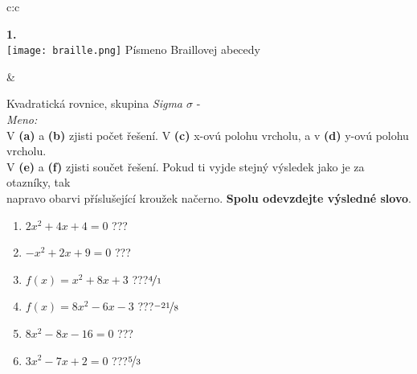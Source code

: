 \documentclass[10pt]{report}
\begin{document}
\begin{tabular}{c:c}
\begin{minipage}[c][99mm][t]{0.49\linewidth}
\begin{center}
\begin{minipage}{0.20\linewidth}
\begin{center}
{\Huge\bfseries 1.} \\[2mm]
\texttt{[image: braille.png]}
{\small Písmeno Braillovej abecedy}
\end{center}
\end{minipage}
\end{center}
\end{minipage}
&
\begin{minipage}[c][99mm][t]{0.49\linewidth}
\begin{center}
\vspace{7mm}
{\huge Kvadratická rovnice, skupina \textit{Sigma $\sigma$} -}\\[4.5mm]
\textit{Meno:}\phantom{xxxxxxxxxxxxxxxxxxxxxxxxxxxxxxxxxxxxxxxxxxxxxxxxxxxxxxxxxxxxxxxxx}\\[3.5mm]
V \textbf{(a)} a \textbf{(b)} zjisti počet řešení. V \textbf{(c)} x-ovú polohu vrcholu, a v \textbf{(d)} y-ovú polohu vrcholu.\\V \textbf{(e)} a \textbf{(f)} zjisti součet řešení. Pokud ti vyjde stejný výsledek jako je za otazníky, tak\\napravo obarvi příslušející kroužek načerno. \textbf{Spolu odevzdejte výsledné slovo}.\\[3mm]
\begin{minipage}{0.77\linewidth}
\begin{center}
\begin{varwidth}{\textwidth}
\begin{enumerate}
\large
\item $2x^2+4x+4=0$\quad \dotfill\; ???\;\dotfill {}
\item $-x^2+2x+9=0$\quad \dotfill\; ???\;\dotfill {}
\item $f(x)=x^2+8x+3$\quad \dotfill\; ???\;\dotfill \quad $\nicefrac{4}{1}$
\item $f(x)=8x^2-6x-3$\quad \dotfill\; ???\;\dotfill \quad $\nicefrac{-21}{8}$
\item $8x^2-8x-16=0$\quad \dotfill\; ???\;\dotfill {}
\item $3x^2-7x+2=0$\quad \dotfill\; ???\;\dotfill \quad $\nicefrac{5}{3}$
\end{enumerate}
\end{varwidth}
\end{center}
\end{minipage}
\begin{minipage}{0.20\linewidth}

\end{minipage}
\end{center}
\end{minipage}
\end{tabular}
\end{document}
